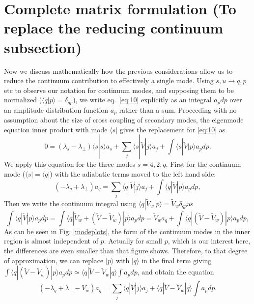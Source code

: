 \documentclass[12pt]{article}
\def\ket#1{|#1\rangle}
\def\bra#1{\langle#1}
\begin{document}
\section{Complete matrix formulation (To replace the reducing
  continuum subsection)}

Now we discuss mathematically how the previous considerations allow us
to reduce the continuum contribution to effectively a single mode.
Using $s,u\to q,p$ etc to observe our notation for continuum modes, and
supposing them to be normalized ($\bra{q}\ket{p}=\delta_{qp}$), we
write eq.\ \ref{eq:10} explicitly as an integral $a_pdp$ over an
amplitude distribution function $a_p$ rather than a sum.
Proceeding with no assumption about the size of cross coupling of secondary
modes, the eigenmode equation inner product with mode $\bra{s}|$ gives
the replacement for \ref{eq:10} as
\begin{equation}
  \label{eigengen}
  0=(\lambda_s-\lambda_\perp)\bra{s}\ket{s}a_s+\sum_j\bra{s}|\tilde{V}\ket{j}a_j
+\int\bra{s}|\tilde{V}\ket{p}a_pdp.
\end{equation}
We apply this equation for the three modes $s=4,2,q$. First for the
continuum mode ($\bra{s}|=\bra{q}|$) with the adiabatic terms moved to
the left hand side:
\begin{equation}
  \label{eigq}
  (-\lambda_q+\lambda_\perp)a_q=\sum_j\bra{q}|\tilde{V}\ket{j}a_j
+\int\bra{q}|\tilde V\ket{p} a_pdp,
\end{equation}
Then we write the continuum integral using $\bra{q}|\tilde V_w\ket{p}=
\tilde V_w \delta_{qp}$as 
\begin{equation}
  \label{eq:18}
  \int \bra{q}|\tilde{V}\ket{p}a_pdp=\int\bra{q}|\tilde{V}_{w}+(\tilde{V}-\tilde{V}_{w})\ket{p}a_pdp
  =\tilde{V}_{w}a_q +\int\bra{q}|(\tilde{V}-\tilde{V}_{w})\ket{p}a_pdp,
\end{equation}
As can be seen in Fig. \ref{modeplots}, the form of the continuum
modes in the inner region is almost independent of $p$. Actually for
small $p$, which is our interest here, the differences are even
smaller than that figure shows. Therefore, to that degree of
approximation, we can replace $\ket{p}$ with $\ket{q}$ in the final
term giving $\int\bra{q}|(\tilde{V}-\tilde{V}_{w})\ket{p}a_pdp\simeq
\bra{q}|\tilde{V}-\tilde{V}_{w}\ket{q}\int a_pdp$, and obtain the
equation
\begin{equation}
  \label{eigq}
  (-\lambda_q+\lambda_\perp-V_w)a_q=\sum_j\bra{q}|\tilde{V}\ket{j}a_j
+\bra{q}|\tilde V-\tilde V_w\ket{q}\int a_pdp.
\end{equation}
\end{document}
